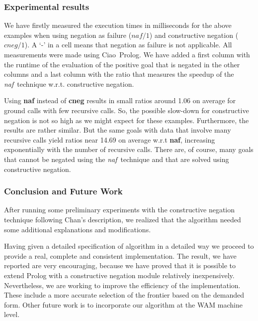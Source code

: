 \documentclass{llncs}
\newcommand{\naf}{{\em naf}}\newcommand{\viejo}[1]{}
\newcommand{\ciao}{Ciao}
\begin{document}

\subsubsection{Experimental results}
\label{results}
We have firstly measured the execution times in milliseconds for the
above examples when using negation as failure ($naf/1$) and
constructive negation ($cneg/1$). A `-' in a cell means that negation
as failure is not applicable. All measurements were made using \ciao\
Prolog. We have added a first
column with the runtime of the evaluation of the positive goal that is
negated in the other columns and a last column with the ratio that
measures the speedup of the \naf\ technique w.r.t. constructive
negation.

Using {\bf naf} instead of {\bf cneg} results in small ratios around
1.06 on average for ground calls with few recursive calls. So, the
possible slow-down for constructive negation is not so high as we
might expect for these examples. Furthermore, the results are rather
similar. But the same goals with data that involve many recursive
calls yield ratios near 14.69 on average w.r.t {\bf naf},
increasing exponentially with the number of recursive calls. There
are, of course, many goals that cannot be negated using the \naf\
technique and that are solved using constructive negation.

 


\vspace{-1em}
\subsubsection{Conclusion and Future Work}
\label{conclusion}
\vspace{-1em}
After running some preliminary experiments with the constructive 
negation technique  following Chan's description, we realized that the
algorithm needed some additional explanations and modifications.

Having given a detailed specification of algorithm in a detailed way
we proceed to provide a real, complete and consistent
implementation. The result, we have reported are very encouraging,
because we have proved that it is possible to extend Prolog with a
constructive negation module relatively inexpensively. 
Nevertheless, we are
working to improve the efficiency of the implementation. These include
a more accurate selection of the frontier based on the demanded form.
Other future work is to
incorporate our algorithm at the WAM machine level.
\end{document}
